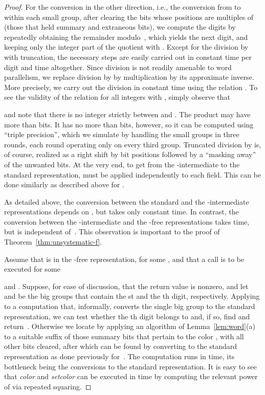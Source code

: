 \documentclass[envcountsame,envcountsect,undated,nolinenumbers]{lnthi}
\def\Tvn#1{\hbox{\textit{#1\/}}}
\begin{document}
\begin{proof}
For the conversion in the other direction,
i.e., the conversion from
 to
 within each small group,
after clearing the bits whose positions are
multiples of  (those that held
summary and extraneous bits),
we compute the digits 
by repeatedly obtaining the remainder modulo~,
which yields the next digit, and keeping
only the integer part of the quotient with .
Except for the division by  with
truncation, the necessary steps are easily carried out in
constant time per digit and  time altogether.
Since division is not readily amenable to
word parallelism, we replace division by 
by multiplication by its approximate inverse.
More precisely, we carry out the division in
constant time using the relation
.
To see the validity of the relation for
all integers  with ,
simply observe that

and note that there is no integer
strictly between  and .
The product 
may have more than  bits.
It has no more than  bits, however, so it can
be computed using ``triple precision'', which
we simulate by handling the small groups
in three rounds, each round operating only on
every third group.
Truncated division by  is, of course, realized
as a right shift by  bit positions followed by
a ``masking away'' of the unwanted bits.
At the very end, to get from the
-intermediate to the standard representation,
 must be
applied independently to each field.
This can be done similarly as described above
for .

As detailed above, the conversion between
the standard and the -intermediate representations
depends on , but takes only constant time.
In contrast, the conversion between the
-intermediate and the -free representations
takes  time, but is independent of~.
This observation is important to
the proof of Theorem~\ref{thm:unsystematic-f}.

Assume that  is in the -free representation, for
some , and that a
call  is to be
executed for some

and .
Suppose, for ease of discussion, that the return value
 is nonzero, and let  and  be the big
groups that contain the st and the th
digit, respectively.
Applying to  a computation that, informally,
converts the single big group  to the standard
representation, we can test whether
the th digit belongs to  and,
if so, find and return~.
Otherwise we locate  by applying an algorithm
of Lemma~\ref{lem:word}(a) to a suitable suffix of
those summary bits that pertain
to the color , with all other bits cleared,
after which  can be found by converting
 to the standard representation
as done previously for~.
The computation runs in  time, its
bottleneck being the conversions to the
standard representation.
It is easy to see that \Tvn{color} and \Tvn{setcolor}
can be executed in  time by computing
the relevant power of  via repeated squaring.


\end{proof}
\end{document}
